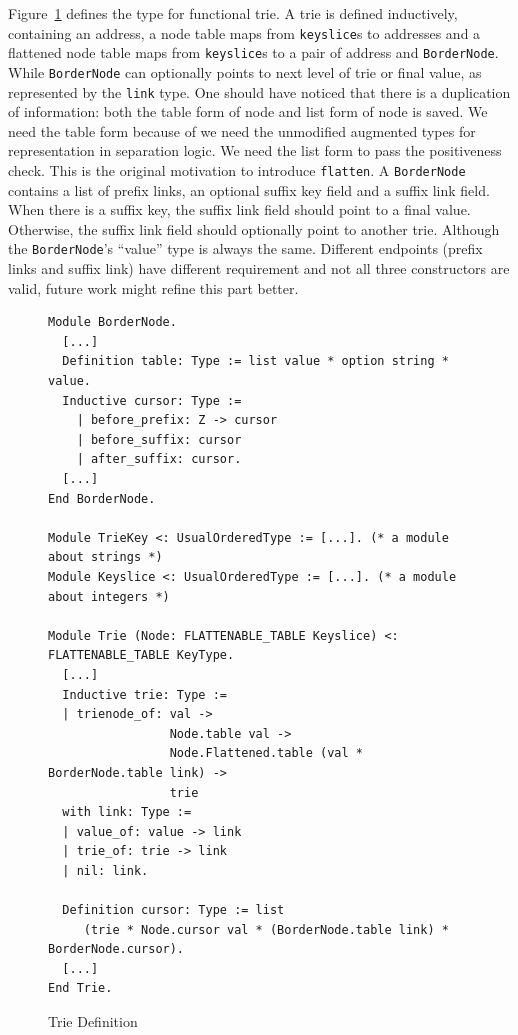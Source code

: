 \documentclass[runningheads]{llncs}
\begin{document}
Figure~\ref{fig:typedef} defines the type for functional trie. A trie is defined
inductively, containing an address, a node table maps from \texttt{keyslice}s to
addresses and a flattened node table maps from \texttt{keyslice}s to a pair of
address and \texttt{BorderNode}. While \texttt{BorderNode} can optionally points
to next level of trie or final value, as represented by the \texttt{link} type.
One should have noticed that there is a duplication of information: both the
table form of node and list form of node is saved. We need the table form
because of we need the unmodified augmented types for representation in
separation logic. We need the list form to pass the positiveness check. This is
the original motivation to introduce \texttt{flatten}. A \texttt{BorderNode}
contains a list of prefix links, an optional suffix key field and a suffix link
field. When there is a suffix key, the suffix link field should point to a
final value. Otherwise, the suffix link field should optionally point to
another trie. Although the \texttt{BorderNode}'s ``value'' type is always the
same. Different endpoints (prefix links and suffix link) have different
requirement and not all three constructors are valid, future work might refine
this part better.


\begin{figure}[htbp]
  \centering
\begin{verbatim}
Module BorderNode.
  [...]
  Definition table: Type := list value * option string * value.
  Inductive cursor: Type :=
    | before_prefix: Z -> cursor
    | before_suffix: cursor
    | after_suffix: cursor.
  [...]
End BorderNode.

Module TrieKey <: UsualOrderedType := [...]. (* a module about strings *)
Module Keyslice <: UsualOrderedType := [...]. (* a module about integers *)

Module Trie (Node: FLATTENABLE_TABLE Keyslice) <: FLATTENABLE_TABLE KeyType.
  [...]
  Inductive trie: Type :=
  | trienode_of: val ->
                 Node.table val ->
                 Node.Flattened.table (val * BorderNode.table link) ->
                 trie
  with link: Type :=
  | value_of: value -> link
  | trie_of: trie -> link
  | nil: link.

  Definition cursor: Type := list
     (trie * Node.cursor val * (BorderNode.table link) * BorderNode.cursor).
  [...]
End Trie.
\end{verbatim}
  \caption{Trie Definition}\label{fig:typedef}
\end{figure}
\end{document}
